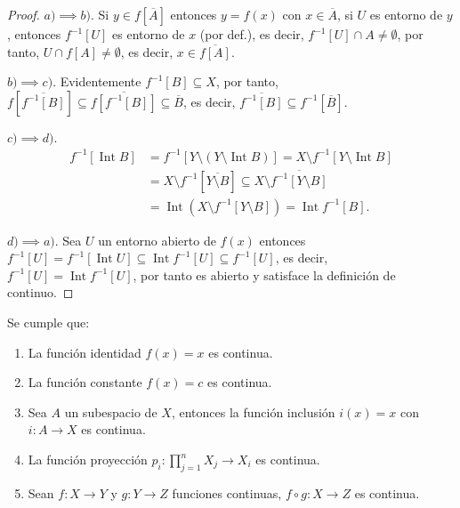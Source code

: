 \documentclass[11pt,oneside,a4paper]{book}
\DeclareMathOperator{\Int}{Int}
\begin{document}
\begin{proof}
$a)\implies b)$. Si $y\in f[\overline{A}]$ entonces $y=f(x)$ con $x\in\overline{A}$, si $U$ es entorno de $y$, entonces $f^{-1}[U]$ es entorno de $x$ (por def.), es decir, $f^{-1}[U]\cap A\neq\emptyset$, por tanto, $U\cap f[A]\neq\emptyset$, es decir, $x\in\overline{f[A]}$.

$b)\implies c)$. Evidentemente $f^{-1}[B]\subseteq X$, por tanto, $f[\overline{f^{-1}[B]}]\subseteq\overline{f[f^{-1}[B]]}\subseteq\overline{B}$, es decir, $\overline{f^{-1}[B]}\subseteq f^{-1}[\overline{B}]$.

$c)\implies d)$.
\begin{align*}
f^{-1}[\Int B]&=f^{-1}[Y\setminus(Y\setminus\Int B)]=X\setminus f^{-1}[Y\setminus\Int B]\\
&=X\setminus f^{-1}[\overline{Y\setminus B}]\subseteq X\setminus\overline{f^{-1}[Y\setminus B]}\\
&=\Int(X\setminus f^{-1}[Y\setminus B])=\Int f^{-1}[B].
\end{align*}

$d)\implies a)$. Sea $U$ un entorno abierto de $f(x)$ entonces $f^{-1}[U]=f^{-1}[\Int U]\subseteq\Int f^{-1}[U]\subseteq f^{-1}[U]$, es decir, $f^{-1}[U]=\Int f^{-1}[U]$, por tanto es abierto y satisface la definición de continuo.
\end{proof}
\begin{thm}
Se cumple que:
\begin{enumerate}[1)]
\item La función identidad $f(x)=x$ es continua.
\item La función constante $f(x)=c$ es continua.
\item Sea $A$ un subespacio de $X$, entonces la función inclusión $i(x)=x$ con $i:A\rightarrow X$ es continua.
\item La función proyección $p_i:\prod_{j=1}^n X_j\rightarrow X_i$ es continua.
\item Sean $f:X\rightarrow Y$ y $g:Y\rightarrow Z$ funciones continuas, $f\circ g:X\rightarrow Z$ es continua.
\end{enumerate}
\end{thm}
\end{document}
